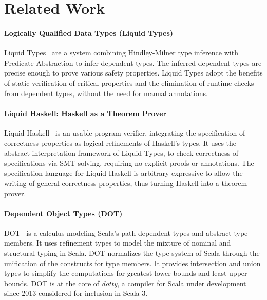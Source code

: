 \chapter{Related Work}
\label{chp:related}

\begin{minipage}{0.9\textwidth}
\subsubsection{Logically Qualified Data Types (Liquid Types)}
Liquid Types~\cite{liquid-types} are a system
combining Hindley-Milner type inference with Predicate Abstraction
to infer dependent types.
The inferred dependent types are precise enough
to prove various safety properties.
Liquid Types adopt the benefits of
static verification of critical properties and
the elimination of runtime checks
from dependent types,
without the need for manual annotations.
\\
\subsubsection{Liquid Haskell: Haskell as a Theorem Prover}
Liquid Haskell~\cite{liquid-haskell} is an usable
program verifier, integrating
the specification of correctness properties
as logical refinements of Haskell's types.
It uses the abstract interpretation framework of Liquid Types,
to check correctness of specifications via SMT solving,
requiring no explicit proofs or annotations.
The specification language for Liquid Haskell
is arbitrary expressive to allow
the writing of general correctness properties,
thus turning Haskell into a theorem prover.
\\
\subsubsection{Dependent Object Types (DOT)}
DOT~\cite{dot1,dot2} is a calculus
modeling Scala's path-dependent types and abstract type members.
It uses refinement types to model the mixture of
nominal and structural typing in Scala.
DOT normalizes the type system of Scala
through the unification of the constructs for type members.
It provides intersection and union types
to simplify the computations for greatest lower-bounds
and least upper-bounds.
DOT is at the core of \textit{dotty},
a compiler for Scala under development since 2013
considered for inclusion in Scala 3.
\end{minipage}

